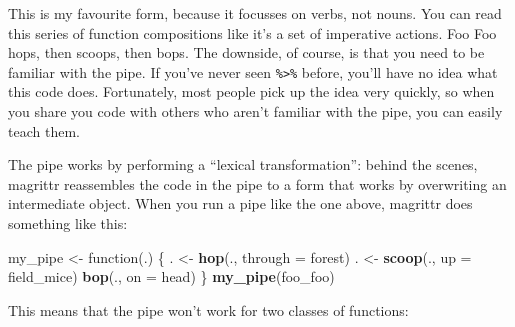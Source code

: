 \documentclass[]{book}
\newenvironment{Shaded}{\begin{snugshade}}{\end{snugshade}}
\newcommand{\KeywordTok}[1]{\textcolor[rgb]{0.13,0.29,0.53}{\textbf{{#1}}}}
\newcommand{\DataTypeTok}[1]{\textcolor[rgb]{0.13,0.29,0.53}{{#1}}}
\newcommand{\StringTok}[1]{\textcolor[rgb]{0.31,0.60,0.02}{{#1}}}
\newcommand{\NormalTok}[1]{{#1}}
\begin{document}
This is my favourite form, because it focusses on verbs, not nouns. You
can read this series of function compositions like it's a set of
imperative actions. Foo Foo hops, then scoops, then bops. The downside,
of course, is that you need to be familiar with the pipe. If you've
never seen \texttt{\%\textgreater{}\%} before, you'll have no idea what
this code does. Fortunately, most people pick up the idea very quickly,
so when you share you code with others who aren't familiar with the
pipe, you can easily teach them.

The pipe works by performing a ``lexical transformation'': behind the
scenes, magrittr reassembles the code in the pipe to a form that works
by overwriting an intermediate object. When you run a pipe like the one
above, magrittr does something like this:

\begin{Shaded}
\begin{Highlighting}[]
\NormalTok{my_pipe <-}\StringTok{ }\NormalTok{function(.) \{}
  \NormalTok{. <-}\StringTok{ }\KeywordTok{hop}\NormalTok{(., }\DataTypeTok{through =} \NormalTok{forest)}
  \NormalTok{. <-}\StringTok{ }\KeywordTok{scoop}\NormalTok{(., }\DataTypeTok{up =} \NormalTok{field_mice)}
  \KeywordTok{bop}\NormalTok{(., }\DataTypeTok{on =} \NormalTok{head)}
\NormalTok{\}}
\KeywordTok{my_pipe}\NormalTok{(foo_foo)}
\end{Highlighting}
\end{Shaded}

This means that the pipe won't work for two classes of functions:
\end{document}
